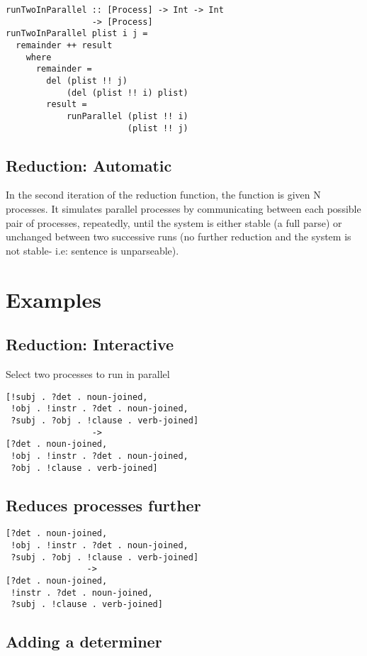 \documentclass{article}
\begin{document}
\begin{lstlisting}
runTwoInParallel :: [Process] -> Int -> Int 
                 -> [Process]
runTwoInParallel plist i j =
  remainder ++ result
	where 
	  remainder = 
		del (plist !! j) 
			(del (plist !! i) plist)
		result = 
			runParallel (plist !! i) 
			            (plist !! j)
\end{lstlisting}


\subsection{Reduction: Automatic}

In the second iteration of the reduction function, the function is given N processes. It simulates parallel processes by communicating between each possible pair of processes, repeatedly, until the system is either stable (a full parse) or unchanged between two successive runs (no further reduction and the system is not stable- i.e: sentence is unparseable).

\section{Examples}

\subsection{Reduction: Interactive}
    
Select two processes to run in parallel

\begin{lstlisting}
[!subj . ?det . noun-joined,
 !obj . !instr . ?det . noun-joined,
 ?subj . ?obj . !clause . verb-joined]
                 ->
[?det . noun-joined,
 !obj . !instr . ?det . noun-joined,
 ?obj . !clause . verb-joined]
\end{lstlisting}
    
\subsection{Reduces processes further}

\begin{lstlisting}
[?det . noun-joined,
 !obj . !instr . ?det . noun-joined,
 ?subj . ?obj . !clause . verb-joined]
                ->
[?det . noun-joined,
 !instr . ?det . noun-joined,
 ?subj . !clause . verb-joined]
\end{lstlisting}

\subsection{Adding a determiner}
\end{document}
